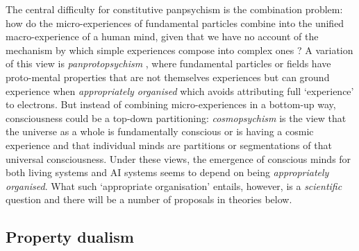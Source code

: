 \documentclass[11pt, a4paper, onecolumn, gdm]{google}
\begin{document}
The central difficulty for constitutive panpsychism is the combination problem: how do the micro-experiences of fundamental particles combine into the unified macro-experience of a human mind, given that we have no account of the mechanism by which simple experiences compose into complex ones \citep{chalmers2016}?
A variation of this view is \emph{panprotopsychism} \citep{chalmers2015}, where fundamental particles or fields have proto-mental properties that are not themselves experiences but can ground experience when \emph{appropriately organised} which avoids attributing full `experience' to electrons.
But instead of combining micro-experiences in a bottom-up way, consciousness could be a top-down partitioning: \emph{cosmopsychism} \citep{shani2015,goff2017} is the view that the universe as a whole is fundamentally conscious or is having a cosmic experience and that individual minds are partitions or segmentations of that universal consciousness.
Under these views, the emergence of conscious minds for both living systems and AI systems seems to depend on being \emph{appropriately organised}.
What such `appropriate organisation' entails, however, is a \emph{scientific} question and there will be a number of proposals in theories below.

\subsection{Property dualism}\label{property-dualism}
\end{document}
